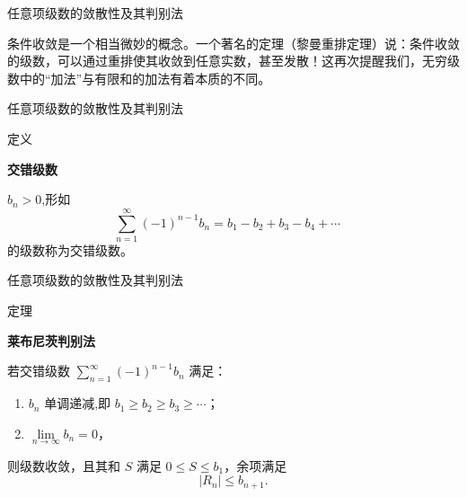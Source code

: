 \documentclass[aspectratio=169,10pt,fontset=fandol]{ctexbeamer}
\newenvironment{custom}[1]{\par\noindent\textbf{#1}\quad}{\par\vspace{0.8em}}
\begin{document}
\begin{frame}[t,fragile]{任意项级数的敛散性及其判别法}
\normalsize
{\normalsize
条件收敛是一个相当微妙的概念。一个著名的定理（黎曼重排定理）说：条件收敛的级数，可以通过重排使其收敛到任意实数，甚至发散！这再次提醒我们，无穷级数中的“加法”与有限和的加法有着本质的不同。

}
\end{frame}
\begin{frame}[t,fragile]{任意项级数的敛散性及其判别法}
\normalsize
\begin{block}{定义}
{\normalsize
\textbf{交错级数}\par

$b_n > 0$,形如
\[
\sum_{n=1}^{\infty} (-1)^{n-1} b_n = b_1 - b_2 + b_3 - b_4 + \cdots \quad 
\]
的级数称为交错级数。

}
\end{block}
\end{frame}
\begin{frame}[t,fragile]{任意项级数的敛散性及其判别法}
\normalsize
\begin{block}{定理}
{\normalsize
\textbf{莱布尼茨判别法}\par

若交错级数 \(\sum_{n=1}^{\infty} (-1)^{n-1} b_n\) 满足：
\begin{enumerate}
\item \(b_n\) 单调递减,即 \(b_1 \geq b_2 \geq b_3 \geq \cdots\)；
\item \(\lim\limits_{n\to\infty} b_n = 0\)，
\end{enumerate}
则级数收敛，且其和 \(S\) 满足 \(\boxed{0\leq S\leq b_1}\)，余项满足
\[
\boxed{|R_n|\le b_{n+1}}.
\]

}
\end{block}
\end{frame}
\end{document}
